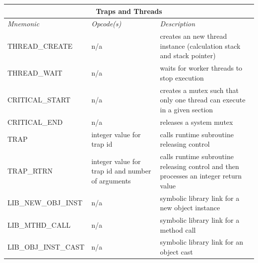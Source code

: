\documentclass[11pt]{article}
\begin{document}
\begin{center}
  \vspace{\baselineskip}
  \begin{tabular}{| l | p{4 cm} | p{6 cm} |}
    \hline
    \multicolumn{3}{|c|}{\textbf{Traps and Threads}} \\
    \hline
    \emph{Mnemonic}  &  \emph{Opcode(s)}  &  \emph{Description} \\ \hline \hline
    THREAD\_CREATE & n/a & creates an new thread instance (calculation stack and  stack pointer) \\ \hline
    THREAD\_WAIT & n/a & waits for worker threads to stop execution \\ \hline
    CRITICAL\_START & n/a & creates a mutex such that only one thread can execute in a given section \\ \hline
    CRITICAL\_END & n/a & releases a system mutex \\ \hline
    TRAP & integer value for trap id & calls runtime subroutine releasing control \\ \hline
    TRAP\_RTRN & integer value for trap id and number of arguments &
    calls runtime subroutine releasing control and then processes an integer return value \\ \hline
    LIB\_NEW\_OBJ\_INST & n/a & symbolic library link for a new object instance  \\ \hline
    LIB\_MTHD\_CALL & n/a & symbolic library link for a method call  \\ \hline
    LIB\_OBJ\_INST\_CAST & n/a & symbolic library link for an object cast  \\ \hline
  \end{tabular}
\end{center}
\end{document}
